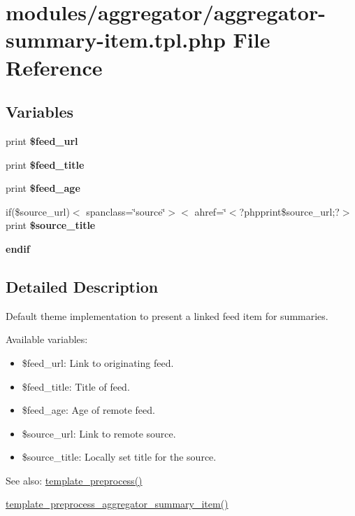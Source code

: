 \hypertarget{aggregator-summary-item_8tpl_8php}{
\section{modules/aggregator/aggregator-summary-item.tpl.php File Reference}
\label{aggregator-summary-item_8tpl_8php}
}
\subsection*{Variables}
\begin{CompactItemize}
\item 
\hypertarget{aggregator-summary-item_8tpl_8php_a9dadc8b078c51d64c9c67fe879f12c7}{
print \textbf{\$feed\_\-url}}
\label{aggregator-summary-item_8tpl_8php_a9dadc8b078c51d64c9c67fe879f12c7}

\item 
\hypertarget{aggregator-summary-item_8tpl_8php_6edb4dc2cf77c7c787f39d946791c26a}{
print \textbf{\$feed\_\-title}}
\label{aggregator-summary-item_8tpl_8php_6edb4dc2cf77c7c787f39d946791c26a}

\item 
\hypertarget{aggregator-summary-item_8tpl_8php_70ad511a3fda1a5fffb44bc8d82c4dde}{
print \textbf{\$feed\_\-age}}
\label{aggregator-summary-item_8tpl_8php_70ad511a3fda1a5fffb44bc8d82c4dde}

\item 
\hypertarget{aggregator-summary-item_8tpl_8php_388fc7503e7d8eacef3d2a432ffd0687}{
if(\$source\_\-url)$<$ spanclass=\char`\"{}source\char`\"{}$>$$<$ ahref=\char`\"{}$<$?phpprint\$source\_\-url;?$>$ print \textbf{\$source\_\-title}}
\label{aggregator-summary-item_8tpl_8php_388fc7503e7d8eacef3d2a432ffd0687}

\item 
\hypertarget{aggregator-summary-item_8tpl_8php_82cd33ca97ff99f2fcc5e9c81d65251b}{
\textbf{endif}}
\label{aggregator-summary-item_8tpl_8php_82cd33ca97ff99f2fcc5e9c81d65251b}

\end{CompactItemize}


\subsection{Detailed Description}
Default theme implementation to present a linked feed item for summaries.

Available variables:\begin{itemize}
\item \$feed\_\-url: Link to originating feed.\item \$feed\_\-title: Title of feed.\item \$feed\_\-age: Age of remote feed.\item \$source\_\-url: Link to remote source.\item \$source\_\-title: Locally set title for the source.\end{itemize}


\begin{Desc}
\item[See also:]\hyperlink{includes_2theme_8inc_3eeb7bcdba7ef4859f99586da264d347}{template\_\-preprocess()} 

\hyperlink{aggregator_8pages_8inc_b60386a469193731ad719534bcdcac56}{template\_\-preprocess\_\-aggregator\_\-summary\_\-item()} \end{Desc}
